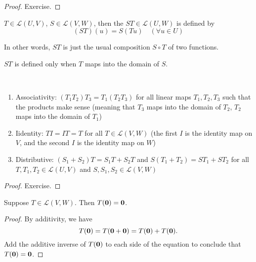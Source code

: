 \begin{proof}
Exercise.
\end{proof}

\begin{definition}
$T\in\mathcal{L}(U,V)$, $S\in\mathcal{L}(V,W)$, then the  $ST\in\mathcal{L}(U,W)$ is defined by
\[(ST)(u)=S(Tu)\quad(\forall u\in U)\]
\end{definition}

\begin{remark}
In other words, $ST$ is just the usual composition $S\circ T$ of two functions.
\end{remark}

\begin{remark}
$ST$ is defined only when $T$ maps into the domain of $S$.
\end{remark}

\begin{proposition} \
\begin{enumerate}[label=(\roman*)]
\item Associativity: $(T_1T_2)T_3=T_1(T_2T_3)$ for all linear maps $T_1,T_2,T_3$ such that the products make sense (meaning that $T_3$ maps into the domain of $T_2$, $T_2$ maps into the domain of $T_1$)
\item Iidentity: $TI=IT=T$ for all $T\in\mathcal{L}(V,W)$ (the first $I$ is the identity map on $V$, and the second $I$ is the identity map on $W$)
\item Distributive: $(S_1+S_2)T=S_1T+S_2T$ and $S(T_1+T_2)=ST_1+ST_2$ for all $T,T_1,T_2\in\mathcal{L}(U,V)$ and $S,S_1,S_2\in\mathcal{L}(V,W)$
\end{enumerate}
\end{proposition}

\begin{proof}
Exercise.
\end{proof}

\begin{proposition}\label{prop:linear-map-0-0}
Suppose $T\in\mathcal{L}(V,W)$. Then $T(\vb{0})=\vb{0}$.
\end{proposition}

\begin{proof}
By additivity, we have
\[T(\vb{0})=T(\vb{0}+\vb{0})=T(\vb{0})+T(\vb{0}).\]
Add the additive inverse of $T(\vb{0})$ to each side of the equation to conclude that $T(\vb{0})=\vb{0}$.
\end{proof}
\pagebreak

